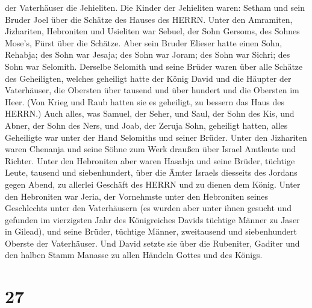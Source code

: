 der Vaterhäuser die Jehieliten.  Die Kinder der Jehieliten
waren: Setham und sein Bruder Joel über die Schätze des Hauses des
HERRN.  Unter den Amramiten, Jizhariten, Hebroniten und
Usieliten  war Sebuel, der Sohn Gersoms, des Sohnes Mose's,
Fürst über die Schätze.  Aber sein Bruder Elieser hatte
einen Sohn, Rehabja; des Sohn war Jesaja; des Sohn war Joram; des Sohn
war Sichri; des Sohn war Selomith.  Derselbe Selomith und
seine Brüder waren über alle Schätze des Geheiligten, welches geheiligt
hatte der König David und die Häupter der Vaterhäuser, die Obersten über
tausend und über hundert und die Obersten im Heer.  (Von
Krieg und Raub hatten sie es geheiligt, zu bessern das Haus des HERRN.)
 Auch alles, was Samuel, der Seher, und Saul, der Sohn des
Kis, und Abner, der Sohn des Ners, und Joab, der Zeruja Sohn, geheiligt
hatten, alles Geheiligte war unter der Hand Selomiths und seiner Brüder.
 Unter den Jizhariten waren Chenanja und seine Söhne zum
Werk draußen über Israel Amtleute und Richter.  Unter den
Hebroniten aber waren Hasabja und seine Brüder, tüchtige Leute, tausend
und siebenhundert, über die Ämter Israels diesseits des Jordans gegen
Abend, zu allerlei Geschäft des HERRN und zu dienen dem König.
 Unter den Hebroniten war Jeria, der Vornehmste unter den
Hebroniten seines Geschlechts unter den Vaterhäusern (es wurden aber
unter ihnen gesucht und gefunden im vierzigsten Jahr des Königreiches
Davids tüchtige Männer zu Jaser in Gilead),  und seine
Brüder, tüchtige Männer, zweitausend und siebenhundert Oberste der
Vaterhäuser. Und David setzte sie über die Rubeniter, Gaditer und den
halben Stamm Manasse zu allen Händeln Gottes und des Königs.

\hypertarget{section-26}{%
\section{27}\label{section-26}}

